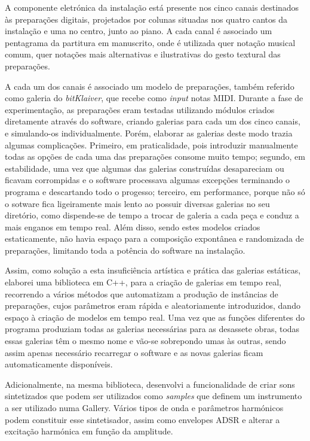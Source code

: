 \documentclass[../main.tex]{subfiles}
\begin{document}
A componente eletrónica da instalação está presente nos cinco canais destinados às preparações digitais, projetados por colunas situadas nos quatro cantos da instalação e uma no centro, junto ao piano. A cada canal é associado um pentagrama da partitura em manuscrito, onde é utilizada quer notação musical comum, quer notações mais alternativas e ilustrativas do gesto textural das preparações.

A cada um dos canais é associado um modelo de preparações, também referido como galeria do \textit{bitKlaiver}, que recebe como \textit{input} notas MIDI. Durante a fase de experimentação, as preparações eram testadas utilizando módulos criados diretamente através do software, criando galerias para cada um dos cinco canais, e simulando-os individualmente. Porém, elaborar as galerias deste modo trazia algumas complicações. Primeiro, em praticalidade, pois introduzir manualmente todas as opções de cada uma das preparações consome muito tempo; segundo, em estabilidade, uma vez que algumas das galerias construídas desapareciam ou ficavam corrompidas e o software processava algumas excepções terminando o programa e descartando todo o progesso; terceiro, em performance, porque não só o sotware fica ligeiramente mais lento ao possuir diversas galerias no seu diretório, como dispende-se de tempo a trocar de galeria a cada peça e conduz a mais enganos em tempo real. Além disso, sendo estes modelos criados estaticamente, não havia espaço para a composição expontânea e randomizada de preparações, limitando toda a potência do software na instalação.

Assim, como solução a esta insuficiência artística e prática das galerias estáticas, elaborei uma biblioteca em C++, para a criação de galerias em tempo real, recorrendo a vários métodos que automatizam a produção de instâncias de preparações, cujos parâmetros eram rápida e aleatoriamente introduzidos, dando espaço à criação de modelos em tempo real. Uma vez que as funções diferentes do programa produziam todas as galerias necessárias para as desassete obras, todas essas galerias têm o mesmo nome e vão-se sobrepondo umas às outras, sendo assim apenas necessário recarregar o software e as novas galerias ficam automaticamente disponíveis.

Adicionalmente, na mesma biblioteca, desenvolvi a funcionalidade de criar sons sintetizados que podem ser utilizados como \textit{samples} que definem um instrumento a ser utilizado numa Gallery. Vários tipos de onda e parâmetros harmónicos podem constituir esse sintetisador, assim como envelopes ADSR e alterar a excitação harmónica em função da amplitude.

\inputminted{cpp}{Chapters/eletronics.cpp}
\end{document}
